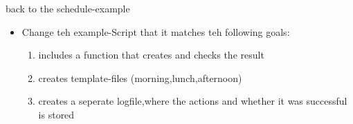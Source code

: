 \documentclass[hyperref={pdfpagelabels=false}]{beamer}
\begin{document}
        \begin{frame}{back to the schedule-example}
			\begin{itemize}
                \item<1-> Change teh example-Script that it matches teh following goals:
                \begin{enumerate}
                    \item<1-> includes a function that creates and checks the result
                    \item<1-> creates template-files (morning,lunch,afternoon)
                    \item<1-> creates a seperate logfile,where the actions and whether it was successful is stored 
                \end{enumerate}
            \end{itemize}
		\end{frame}
        
\end{document}
